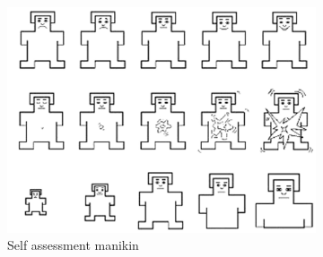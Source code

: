 \begin{figure}
	\centering
	\begin{subfigure}{0.5\textwidth}
		\includegraphics[width=\textwidth]{./images/F1_large.jpg}
		\caption{Self assessment manikin}
		\label{fig:sam_questionnaire}
	\end{subfigure}%
	\hfill
	\begin{subfigure}{0.25\textwidth}

\end{subfigure}
\end{figure}
